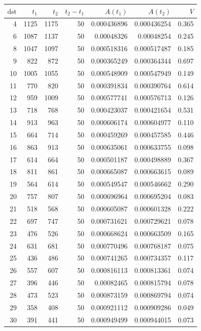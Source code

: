 \begin{tabular}{r r r r r r r}
\toprule
$\mathrm{dst}$ & $t_1$ & $t_2$ & $t_2-t_1$ & $A(t_1)$ & $A(t_2)$ & $V$ \\
\midrule
4 & 1125 & 1175 & 50 & 0.000436896 & 0.000436254 & 0.365 \\
6 & 1087 & 1137 & 50 & 0.00048326 & 0.00048254 & 0.245 \\
8 & 1047 & 1097 & 50 & 0.000518316 & 0.000517487 & 0.185 \\
9 & 822 & 872 & 50 & 0.000365249 & 0.000364344 & 0.697 \\
10 & 1005 & 1055 & 50 & 0.000548909 & 0.000547949 & 0.149 \\
11 & 770 & 820 & 50 & 0.000391834 & 0.000390764 & 0.614 \\
12 & 959 & 1009 & 50 & 0.000577741 & 0.000576713 & 0.126 \\
13 & 718 & 768 & 50 & 0.000423037 & 0.000421654 & 0.531 \\
14 & 913 & 963 & 50 & 0.000606174 & 0.000604977 & 0.110 \\
15 & 664 & 714 & 50 & 0.000459269 & 0.000457585 & 0.446 \\
16 & 863 & 913 & 50 & 0.000635061 & 0.000633755 & 0.098 \\
17 & 614 & 664 & 50 & 0.000501187 & 0.000498889 & 0.367 \\
18 & 811 & 861 & 50 & 0.000665087 & 0.000663615 & 0.089 \\
19 & 564 & 614 & 50 & 0.000549547 & 0.000546662 & 0.290 \\
20 & 757 & 807 & 50 & 0.000696964 & 0.000695204 & 0.083 \\
21 & 518 & 568 & 50 & 0.000605087 & 0.000601328 & 0.222 \\
22 & 697 & 747 & 50 & 0.000731621 & 0.000729621 & 0.078 \\
23 & 476 & 526 & 50 & 0.000668624 & 0.000663509 & 0.165 \\
24 & 631 & 681 & 50 & 0.000770496 & 0.000768187 & 0.075 \\
25 & 436 & 486 & 50 & 0.000741265 & 0.000734357 & 0.117 \\
26 & 557 & 607 & 50 & 0.000816113 & 0.000813361 & 0.074 \\
27 & 396 & 446 & 50 & 0.00082465 & 0.000815794 & 0.078 \\
28 & 473 & 523 & 50 & 0.000873159 & 0.000869794 & 0.074 \\
29 & 358 & 408 & 50 & 0.000921112 & 0.000909286 & 0.049 \\
30 & 391 & 441 & 50 & 0.000949499 & 0.000944015 & 0.073 \\

\end{tabular}
